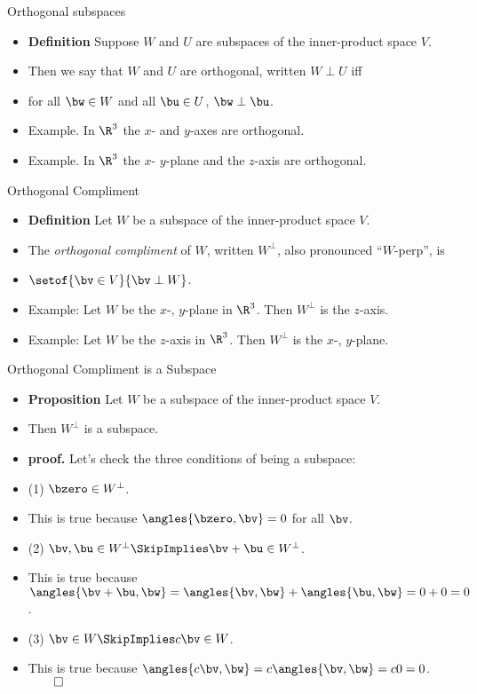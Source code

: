 \documentclass{beamer}
\begin{document}
\begin{frame}{Orthogonal subspaces}
\begin{itemize}
\item \textbf{Definition} Suppose $W$ and $U$ are subspaces of the inner-product space $V$.
\item Then we say that $W$ and $U$ are orthogonal, written $W\perp U$ iff
\item for all $\bw\in W$ and all $\bu\in U$, $\bw\perp\bu$.
\item Example. In $\R^3$ the $x$- and $y$-axes are orthogonal.
\item Example. In $\R^3$ the $x$- $y$-plane and the $z$-axis are orthogonal.
\end{itemize}
\end{frame}

\begin{frame}{Orthogonal Compliment}
\begin{itemize}
\item \textbf{Definition} Let $W$ be a subspace of the inner-product space $V$.
\item The \emph{orthogonal compliment} of $W$, written $W^{\perp}$, also pronounced ``$W$-perp'', is
\item $\setof{\bv\in V}{\bv\perp W}$.
\item Example: Let $W$ be the $x$-, $y$-plane in $\R^3$. Then $W^{\perp}$ is the $z$-axis.
\item Example: Let $W$ be the $z$-axis in $\R^3$. Then $W^{\perp}$ is the $x$-, $y$-plane.
\end{itemize}
\end{frame}

\begin{frame}{Orthogonal Compliment is a Subspace}
\begin{itemize}
\item \textbf{Proposition} Let $W$ be a subspace of the inner-product space $V$.
\item Then $W^{\perp}$ is a subspace.
\item \textbf{proof.} Let's check the three conditions of being a subspace:
\item (1) $\bzero\in W^{\perp}$.
\item This is true because $\angles{\bzero, \bv} = 0$ for all $\bv$.
\item (2) $\bv,\bu\in W^{\perp} \SkipImplies \bv+\bu \in W^{\perp}$.
\item This is true because $\angles{\bv+\bu,\bw}=\angles{\bv,\bw}+\angles{\bu,\bw} = 0 + 0 = 0$.
\item (3) $\bv\in W \SkipImplies c\bv\in W$.
\item This is true because $\angles{c\bv,\bw} = c\angles{\bv,\bw} = c0 = 0$. $\qed$
\end{itemize}
\end{frame}
\end{document}
